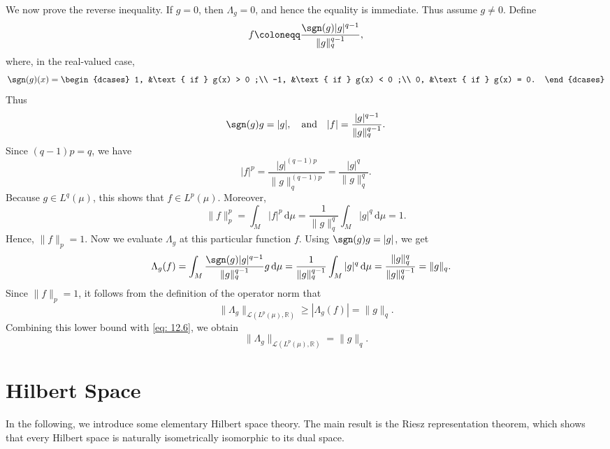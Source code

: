 \begin{eg}
\[    \]
    We now prove the reverse inequality. If \(g = 0\), then \(\Lambda _g = 0\), and hence the equality is immediate. Thus assume \(g \neq 0\). Define 
    \[
        f \coloneqq \frac{\sgn (g) \vert g \vert^{q - 1} }{\lVert g \rVert_q^{q - 1} },
    \]   
    where, in the real-valued case, 
    \[
        \sgn (g) (x) = \begin{dcases}
            1, &\text{ if } g(x) > 0 ;\\
            -1, &\text{ if } g(x) < 0 ;\\
            0, &\text{ if } g(x) = 0.
        \end{dcases}
    \]
    Thus 
    \[
        \sgn (g) g = \vert g \vert, \quad \text{and} \quad \vert f \vert = \frac{\vert g \vert^{q - 1} }{\lVert g \rVert_q^{q - 1} }.    
    \]
    Since \((q - 1)p = q\), we have 
    \[
        \vert f \vert^p = \frac{\vert g \vert^{(q - 1) p} }{\lVert g \rVert_q^{(q - 1) p} } = \frac{\vert g \vert^q }{\lVert g \rVert_q^q }.
    \] 
    Because \(g \in L^q(\mu )\), this shows that \(f \in L^p(\mu )\). Moreover,
    \[
        \lVert f \rVert_p^p = \int _M \vert f \vert^p \, \mathrm{d} \mu = \frac{1}{\lVert g \rVert_q^q } \int _M \vert g \vert^q \, \mathrm{d} \mu = 1.     
    \]  
    Hence, \(\lVert f \rVert_p = 1 \). Now we evaluate \(\Lambda _g\) at this particular function \(f\). Using \(\sgn (g) g = \vert g \vert \), we get 
    \begin{align*}
        \Lambda _g (f) &= \int _M \frac{\sgn (g) \vert g \vert^{q - 1} }{\lVert g \rVert_q^{q - 1} } g \, \mathrm{d} \mu = \frac{1}{\lVert g \rVert_q^{q - 1} } \int _M \vert g \vert^q \, \mathrm{d} \mu = \frac{\lVert g \rVert_q^q }{\lVert g \rVert_q^{q - 1} } = \lVert g \rVert_q.    
    \end{align*} 
    Since \(\lVert f \rVert_p = 1 \), it follows from the definition of the operator norm that 
    \[
        \lVert \Lambda _g \rVert_{\mathcal{L} \left( L^p(\mu), \mathbb{R} \right) } \ge \left\vert \Lambda _g (f) \right\vert = \lVert g \rVert_q.   
    \]    
    Combining this lower bound with \autoref{eq: 12.6}, we obtain 
    \[
        \lVert \Lambda _g \rVert_{\mathcal{L} \left( L^p(\mu ), \mathbb{R}  \right) } = \lVert g \rVert_q.   
    \] 
\end{eg}

\section{Hilbert Space}
In the following, we introduce some elementary Hilbert space theory. The main result is the Riesz representation theorem, which shows that every Hilbert space is naturally isometrically isomorphic to its dual space. 

